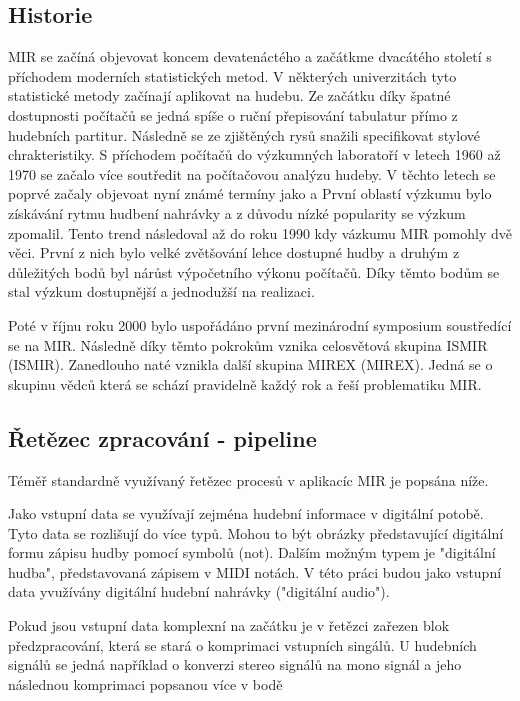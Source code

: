     \subsection{Historie}
    \acs*{MIR} se začíná objevovat koncem devatenáctého a začátkme dvacátého století s příchodem moderních statistických metod.
    V některých univerzitách tyto statistické metody začínají aplikovat na hudebu.
    Ze začátku díky špatné dostupnosti počítačů se jedná spíše o ruční přepisování tabulatur přímo z hudebních partitur.
    Následně se ze zjištěných rysů snažili specifikovat stylové chrakteristiky.  
    S příchodem počítačů do výzkumných laboratoří v letech 1960 až 1970 se začalo více soutředit na počítačovou analýzu hudeby.
    V těchto letech se poprvé začaly objevoat nyní známé termíny jako  a 
    První oblastí výzkumu bylo získávání rytmu hudbení nahrávky a z důvodu nízké popularity se výzkum zpomalil.
    Tento trend následoval až do roku 1990 kdy vázkumu \acs*{MIR} pomohly dvě věci.
    První z nich bylo velké zvětšování lehce dostupné hudby a druhým z důležitých bodů byl nárůst výpočetního výkonu počítačů.
    Díky těmto bodům se stal výzkum dostupnější a jednodužší na realizaci.

    Poté v říjnu roku 2000 bylo uspořádáno první mezinárodní symposium soustředící se na \acs*{MIR}.
    Následně díky těmto pokrokům vznika celosvětová skupina \acs{ISMIR} (\acl{ISMIR}).
    Zanedlouho naté vznikla další skupina \acs{MIREX} (\acl{MIREX}). Jedná se o skupinu vědců která se schází pravidelně každý rok a řeší problematiku \acs{MIR}.
    
   \subsection{Řetězec zpracování - pipeline}

    Téměř standardně využívaný řetězec procesů v aplikacíc \acs{MIR} je popsána níže. 

    Jako vstupní data se využívají zejména hudební informace v digitální potobě.
    Tyto data se rozlišují do více typů. Mohou to být obrázky představující digitální formu zápisu hudby pomocí symbolů (not).
    Dalším možným typem je "digitální hudba", představovaná zápisem v \acs{MIDI} notách.
    V této práci budou jako vstupní data yvužívány digitální hudební nahrávky ("digitální audio"). 

    Pokud jsou vstupní data komplexní na začátku je v řetězci zařezen blok předzpracování, která se stará o komprimaci vstupních singálů.
    U hudebních signálů se jedná například o konverzi stereo signálů na mono signál
    a jeho následnou komprimaci popsanou více v bodě 

